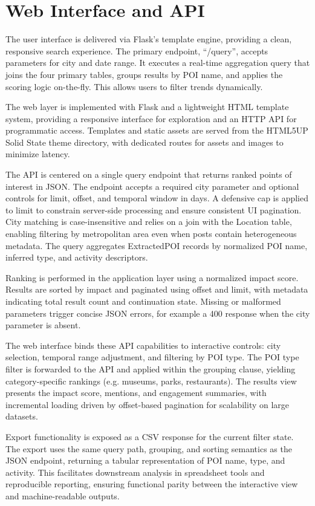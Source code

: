 \documentclass[a4paper,12pt]{report}
\begin{document}
\section{Web Interface and API}


The user interface is delivered via Flask's template engine, providing a clean, responsive search experience. The primary endpoint, “/query”, accepts parameters for city and date range. It executes a real-time aggregation query that joins the four primary tables, groups results by POI name, and applies the scoring logic on-the-fly. This allows users to filter trends dynamically.

The web layer is implemented with Flask and a lightweight HTML template system, providing a responsive interface for exploration and an HTTP API for programmatic access. Templates and static assets are served from the HTML5UP Solid State theme \cite{htmltemp} directory, with dedicated routes for assets and images to minimize latency.

The API is centered on a single query endpoint that returns ranked points of interest in JSON. The endpoint accepts a required city parameter and optional controls for limit, offset, and temporal window in days. A defensive cap is applied to limit to constrain server-side processing and ensure consistent UI pagination. City matching is case-insensitive and relies on a join with the Location table, enabling filtering by metropolitan area even when posts contain heterogeneous metadata. The query aggregates ExtractedPOI records by normalized POI name, inferred type, and activity descriptors.

Ranking is performed in the application layer using a normalized impact score. Results are sorted by impact and paginated using offset and limit, with metadata indicating total result count and continuation state. Missing or malformed parameters trigger concise JSON errors, for example a 400 response when the city parameter is absent.

The web interface binds these API capabilities to interactive controls: city selection, temporal range adjustment, and filtering by POI type. The POI type filter is forwarded to the API and applied within the grouping clause, yielding category-specific rankings (e.g. museums, parks, restaurants). The results view presents the impact score, mentions, and engagement summaries, with incremental loading driven by offset-based pagination for scalability on large datasets.

Export functionality is exposed as a CSV response for the current filter state. The export uses the same query path, grouping, and sorting semantics as the JSON endpoint, returning a tabular representation of POI name, type, and activity. This facilitates downstream analysis in spreadsheet tools and reproducible reporting, ensuring functional parity between the interactive view and machine-readable outputs.
\end{document}
